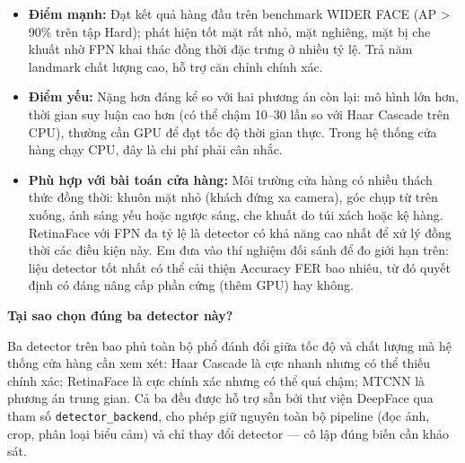 \begin{itemize}
    \item \textbf{Điểm mạnh:} Đạt kết quả hàng đầu trên benchmark WIDER FACE (AP > 90\% trên tập Hard); phát hiện tốt mặt rất nhỏ, mặt nghiêng, mặt bị che khuất nhờ FPN khai thác đồng thời đặc trưng ở nhiều tỷ lệ. Trả năm landmark chất lượng cao, hỗ trợ căn chỉnh chính xác.
    \item \textbf{Điểm yếu:} Nặng hơn đáng kể so với hai phương án còn lại: mô hình lớn hơn, thời gian suy luận cao hơn (có thể chậm 10--30 lần so với Haar Cascade trên CPU), thường cần GPU để đạt tốc độ thời gian thực. Trong hệ thống cửa hàng chạy CPU, đây là chi phí phải cân nhắc.
    \item \textbf{Phù hợp với bài toán cửa hàng:} Môi trường cửa hàng có nhiều thách thức đồng thời: khuôn mặt nhỏ (khách đứng xa camera), góc chụp từ trên xuống, ánh sáng yếu hoặc ngược sáng, che khuất do túi xách hoặc kệ hàng. RetinaFace với FPN đa tỷ lệ là detector có khả năng cao nhất để xử lý đồng thời các điều kiện này. Em đưa vào thí nghiệm đối sánh để đo giới hạn trên: liệu detector tốt nhất có thể cải thiện Accuracy FER bao nhiêu, từ đó quyết định có đáng nâng cấp phần cứng (thêm GPU) hay không.
\end{itemize}

\vspace{0.3cm}
\noindent\textbf{Tại sao chọn đúng ba detector này?}

Ba detector trên bao phủ toàn bộ phổ đánh đổi giữa tốc độ và chất lượng mà hệ thống cửa hàng cần xem xét: Haar Cascade là cực nhanh nhưng có thể thiếu chính xác; RetinaFace là cực chính xác nhưng có thể quá chậm; MTCNN là phương án trung gian. Cả ba đều được hỗ trợ sẵn bởi thư viện DeepFace qua tham số \texttt{detector\_backend}, cho phép giữ nguyên toàn bộ pipeline (đọc ảnh, crop, phân loại biểu cảm) và chỉ thay đổi detector --- cô lập đúng biến cần khảo sát.

\begin{table}[H]
    \centering
    \caption{Tóm tắt điểm mạnh, điểm yếu và vai trò của ba detector trong thí nghiệm đối sánh}
    \label{tab:detector-theory-comparison}
    \small
\end{table}

